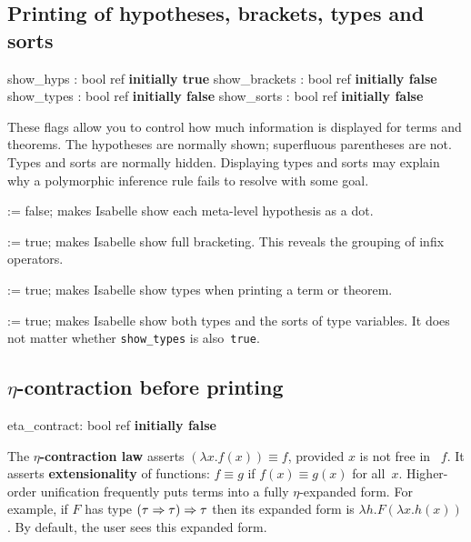 \subsection{Printing of hypotheses, brackets, types and sorts}
\begin{ttbox} 
show_hyps     : bool ref \hfill{\bf initially true}
show_brackets : bool ref \hfill{\bf initially false}
show_types    : bool ref \hfill{\bf initially false}
show_sorts    : bool ref \hfill{\bf initially false}
\end{ttbox}
These flags allow you to control how much information is displayed for
terms and theorems.  The hypotheses are normally shown; superfluous
parentheses are not.  Types and sorts are normally hidden.  Displaying
types and sorts may explain why a polymorphic inference rule fails to
resolve with some goal.

\begin{ttdescription}
\item[\ttindexbold{show_hyps} := false;]   
makes Isabelle show each meta-level hypothesis as a dot.

\item[\ttindexbold{show_brackets} := true;] 
  makes Isabelle show full bracketing.  This reveals the
  grouping of infix operators.

\item[\ttindexbold{show_types} := true;]
makes Isabelle show types when printing a term or theorem.

\item[\ttindexbold{show_sorts} := true;]
makes Isabelle show both types and the sorts of type variables.  It does not
matter whether {\tt show_types} is also~{\tt true}. 
\end{ttdescription}


\subsection{$\eta$-contraction before printing}
\begin{ttbox} 
eta_contract: bool ref \hfill{\bf initially false}
\end{ttbox}
The {\bf $\eta$-contraction law} asserts $(\lambda x.f(x))\equiv f$,
provided $x$ is not free in ~$f$.  It asserts {\bf extensionality} of
functions: $f\equiv g$ if $f(x)\equiv g(x)$ for all~$x$.  Higher-order
unification frequently puts terms into a fully $\eta$-expanded form.  For
example, if $F$ has type $(\tau\Rightarrow\tau)\Rightarrow\tau$ then its expanded form is
$\lambda h.F(\lambda x.h(x))$.  By default, the user sees this expanded
form.

